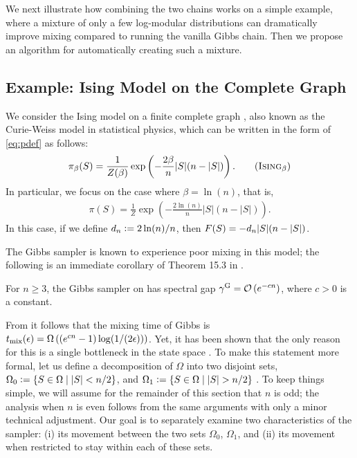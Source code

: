 We next illustrate how combining the two chains works on a simple example, where a mixture of only a few log-modular distributions can dramatically improve mixing compared to running the vanilla Gibbs chain.
Then %
we propose an algorithm for automatically creating such a mixture.

\subsection{Example: Ising Model on the Complete Graph} \label{sect:ising}
We consider the Ising model on a finite complete graph \citep{levin08}, also known as the Curie-Weiss model in statistical physics, which can be written in the form of \eqref{eq:pdef} as follows:
\begin{align*}
  \pib(S) = \frac{1}{Z(\beta)}\exp\left(-\frac{2\beta}{n} |S|(n-|S|)\right). \tag{\isingb}
\end{align*}
In particular, we focus on the case where $\beta = \ln(n)$, that is,
\begin{align*}
  \pi(S) = \frac{1}{Z}\exp\left(-\frac{2\ln(n)}{n} |S|(n-|S|)\right). \tag{\ising}
\end{align*}
In this case, if we define $d_n \vcentcolon= 2 \ln(n) / n$, then $F(S) = -d_n |S|(n-|S|)$.

The Gibbs sampler is known to experience poor mixing in this model; the following is an immediate corollary of Theorem 15.3 in \citep{levin08book}.
\begin{cor}
  For $n \geq 3$, the Gibbs sampler on \ising{} has spectral gap $\gamma^{\mathrm{G}} = \mathcal{O}\left(e^{-cn}\right)$, where $c > 0$ is a constant.
\end{cor}
From  it follows that the mixing time of Gibbs is $t_{\mathrm{mix}}(\epsilon) = \Omega\left((e^{cn} - 1)\log(1/(2\epsilon)) \right)$.
Yet, it has been shown that the only reason for this is a single bottleneck in the state space \citep{levin08}.
To make this statement more formal, let us define a decomposition of $\Omega$ into two disjoint sets, $\Omega_0 \vcentcolon= \{S \in \Omega \mid |S| < n/2\}$, and $\Omega_1 \vcentcolon= \{S \in \Omega \mid |S| > n/2\}$ \citep{jerrum04poincare}.
To keep things simple, we will assume for the remainder of this section that $n$ is odd; the analysis when $n$ is even follows from the same arguments with only a minor technical adjustment.
Our goal is to separately examine two characteristics of the sampler: (i) its movement between the two sets $\Omega_0$, $\Omega_1$, and (ii) its movement when restricted to stay within each of these sets.

